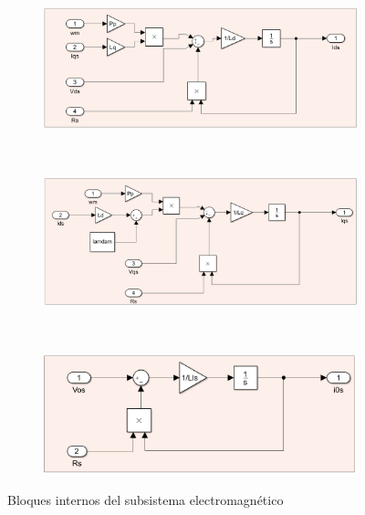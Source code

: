 \documentclass{article}
\begin{document}
\begin{figure}[H]
    \centering
    \begin{subfigure}[]{1\textwidth}
        \centering
        \includegraphics[width=1\textwidth]{sub_electromagentico4.png}
    \end{subfigure}
    \\
    \begin{subfigure}[b]{1\textwidth}
        \centering
        \includegraphics[width=1\textwidth]{sub_electromagentico3.png}
    \end{subfigure}
    \\
    \begin{subfigure}[b]{1\textwidth}
        \centering
        \includegraphics[width=1\textwidth]{sub_electromagentico2.png}
    \end{subfigure}
    \caption{Bloques internos del subsistema electromagnético}
\end{figure}

\end{document}
